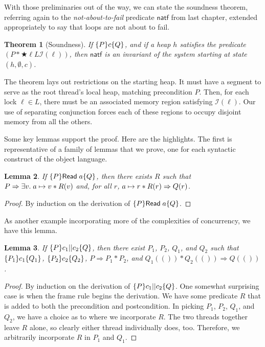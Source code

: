 \documentclass{amsbook}
\newtheorem{theorem}{Theorem}[chapter]
\newtheorem{lemma}[theorem]{Lemma}
\theoremstyle{definition}
\theoremstyle{remark}
\numberwithin{section}{chapter}
\numberwithin{equation}{chapter}
\begin{document}
With those preliminaries out of the way, we can state the soundness theorem, referring again to the \emph{not-about-to-fail} predicate $\mathsf{natf}$ from last chapter, extended appropriately to say that loops are not about to fail.

\invariants
\begin{theorem}[Soundness]
  If $\{P\} c \{Q\}$, and if a heap $h$ satisfies the predicate $(P * \bigstar{\ell}{L}{\mathcal I(\ell)})$, then $\mathsf{natf}$ is an invariant of the system starting at state $(h, \emptyset, c)$.
\end{theorem}

The theorem lays out restrictions on the starting heap.
It must have a segment to serve as the root thread's local heap, matching precondition $P$.
Then, for each lock $\ell \in L$, there must be an associated memory region satisfying $\mathcal I(\ell)$.
Our use of separating conjunction forces each of these regions to occupy disjoint memory from all the others.

Some key lemmas support the proof.
Here are the highlights.
The first is representative of a family of lemmas that we prove, one for each syntactic construct of the object language.

\begin{lemma}
  If $\{P\} \mathsf{Read} \; a \{Q\}$, then there exists $R$ such that $P \Rightarrow \exists v. \; a \mapsto v * R(v)$ and, for all $r$, $a \mapsto r * R(r) \Rightarrow Q(r)$.
\end{lemma}
\begin{proof}
  By induction on the derivation of $\{P\} \mathsf{Read} \; a \{Q\}$.
\end{proof}

As another example incorporating more of the complexities of concurrency, we have this lemma.

\begin{lemma}
  If $\{P\} c_1 || c_2 \{Q\}$, then there exist $P_1$, $P_2$, $Q_1$, and $Q_2$ such that $\{P_1\} c_1 \{Q_1\}$, $\{P_2\} c_2 \{Q_2\}$, $P \Rightarrow P_1 * P_2$, and $Q_1(()) * Q_2(()) \Rightarrow Q(())$.
\end{lemma}
\begin{proof}
  By induction on the derivation of $\{P\} c_1 || c_2 \{Q\}$.
  One somewhat surprising case is when the frame rule begins the derivation.
  We have some predicate $R$ that is added to both the precondition and postcondition.
  In picking $P_1$, $P_2$, $Q_1$, and $Q_2$, we have a choice as to where we incorporate $R$.
  The two threads together leave $R$ alone, so clearly either thread individually does, too.
  Therefore, we arbitrarily incorporate $R$ in $P_1$ and $Q_1$.
\end{proof}
\end{document}
